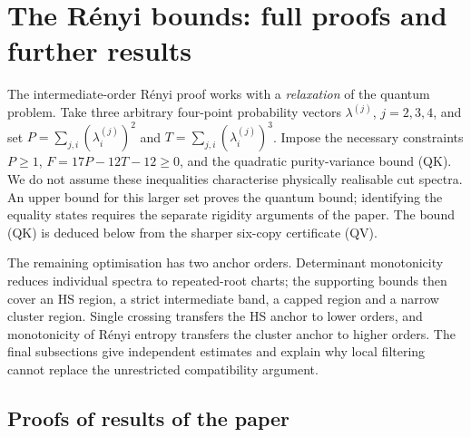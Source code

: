 \section{The R\'enyi bounds: full proofs and further results}\label{sec:sup-renyi}
The intermediate-order R\'enyi proof works with a \emph{relaxation} of the
quantum problem. Take three arbitrary four-point probability vectors
$\lambda^{(j)}$, $j=2,3,4$, and set
$P=\sum_{j,i}(\lambda_i^{(j)})^2$ and
$T=\sum_{j,i}(\lambda_i^{(j)})^3$. Impose the necessary constraints
$P\ge1$, $F=17P-12T-12\ge0$, and the quadratic purity-variance bound
(QK). We do not assume these inequalities characterise physically
realisable cut spectra. An upper bound for this larger set proves the
quantum bound; identifying the equality states requires the separate
rigidity arguments of the paper. The bound (QK)
is deduced below from the sharper six-copy certificate (QV).

The remaining optimisation has two anchor orders. Determinant monotonicity
reduces individual spectra to repeated-root charts; the supporting bounds
then cover an HS region, a strict intermediate band, a capped region and a
narrow cluster region. Single crossing transfers the HS anchor to lower
orders, and monotonicity of R\'enyi entropy transfers the cluster anchor to
higher orders. The final subsections give independent estimates and explain
why local filtering cannot replace the unrestricted compatibility argument.

\subsection*{Proofs of results of the paper}
